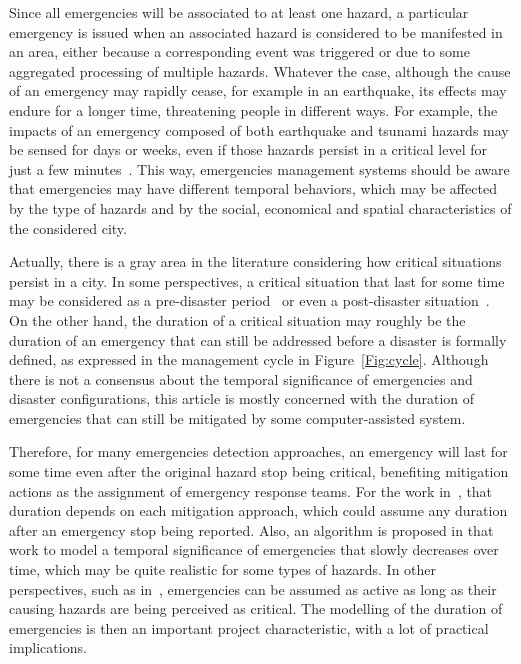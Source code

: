 \begin{refsection}
Since all emergencies will be associated to at least one hazard, a particular emergency is issued when an associated hazard is considered to be manifested in an area, either because a corresponding event was triggered or due to some aggregated processing of multiple hazards. Whatever the case, although the cause of an emergency may rapidly cease, for example in an earthquake, its effects may endure for a longer time, threatening people in different ways. For example, the impacts of an emergency composed of both earthquake and tsunami hazards may be sensed for days or weeks, even if those hazards persist in a critical level for just a few minutes~\cite{tsunami1}. This way, emergencies management systems should be aware that emergencies may have different temporal behaviors, which may be affected by the type of hazards and by the social, economical and spatial characteristics of the considered city.

Actually, there is a gray area in the literature considering how critical situations persist in a city. In some perspectives, a critical situation that last for some time may be considered as a pre-disaster  
period~\cite{citiesdisasters2,citiesdisasters3} or even a post-disaster situation~\cite{citiesdisasters4,citiesdisasters5}. On the other hand, the duration of a critical situation may roughly be the duration of an emergency that can still be addressed before a disaster is formally defined, as expressed in the management cycle in Figure~\ref{Fig:cycle}. Although there is not a consensus about the temporal significance of emergencies and disaster configurations, this article is mostly concerned with the duration of emergencies that can still be mitigated by some computer-assisted system.  

Therefore, for many emergencies detection approaches, an emergency will last for some time even after the original hazard stop being critical, benefiting mitigation actions as the assignment of emergency response teams. For the work in~\cite{emergenciesmetric2}, that duration depends on each mitigation approach, which could assume any duration after an emergency stop being reported. Also, an algorithm is proposed in that work to model a temporal significance of emergencies that slowly decreases over time, which may be quite realistic for some types of hazards. In other perspectives, such as in~\cite{socialmedia1,emergenciesmetric4,emergenciestimemedia}, emergencies can be assumed as active as long as their causing hazards are being perceived as critical. The modelling of the duration of emergencies is then an important project characteristic, with a lot of practical implications.


\end{refsection}
